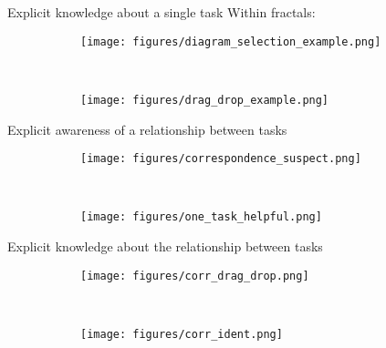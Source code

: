 \documentclass{beamer}
\begin{document}

\begin{frame}{Explicit knowledge about a single task}
Within fractals:
\begin{figure}
\centering
\begin{subfigure}{0.45\textwidth}
\texttt{[image: figures/diagram\_selection\_example.png]}
\end{subfigure}~
\begin{subfigure}{0.45\textwidth}
\texttt{[image: figures/drag\_drop\_example.png]}
\end{subfigure}
\end{figure}
\end{frame}

\begin{frame}{Explicit awareness of a relationship between tasks}
\begin{figure}
\centering
\begin{subfigure}{0.9\textwidth}
\texttt{[image: figures/correspondence\_suspect.png]}
\end{subfigure}\\
\begin{subfigure}{0.9\textwidth}
\texttt{[image: figures/one\_task\_helpful.png]}
\end{subfigure}
\end{figure}
\end{frame}

\begin{frame}{Explicit knowledge about the relationship between tasks}
\begin{figure}
\centering
\begin{subfigure}{0.45\textwidth}
\texttt{[image: figures/corr\_drag\_drop.png]}
\end{subfigure}~
\begin{subfigure}{0.45\textwidth}
\texttt{[image: figures/corr\_ident.png]}
\end{subfigure}
\end{figure}
\end{frame}
\end{document}
